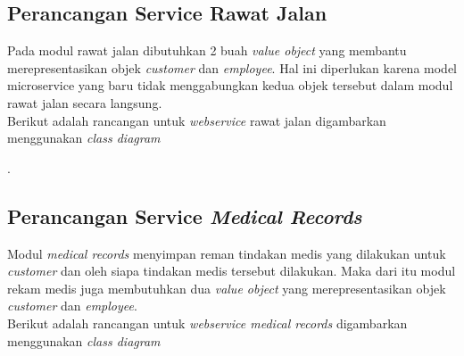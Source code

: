 \subsection{Perancangan Service Rawat Jalan}
Pada modul rawat jalan dibutuhkan 2 buah \textit{value object} yang membantu merepresentasikan objek \textit{customer} dan \textit{employee}. Hal ini diperlukan karena model microservice yang baru tidak menggabungkan kedua objek tersebut dalam modul rawat jalan secara langsung.\\
Berikut adalah rancangan untuk \textit{webservice} rawat jalan digambarkan menggunakan \textit{class diagram}

\begin{adjustbox}{width=1\textwidth}
	\begin{minipage}{\linewidth}
		.
	\end{minipage}
\end{adjustbox}

\subsection{Perancangan Service \textit{Medical Records}}
Modul \textit{medical records} menyimpan reman tindakan medis yang dilakukan untuk \textit{customer} dan oleh siapa tindakan medis tersebut dilakukan. Maka dari itu modul rekam medis juga membutuhkan dua \textit{value object} yang merepresentasikan objek \textit{customer} dan \textit{employee}.\\
Berikut adalah rancangan untuk \textit{webservice medical records} digambarkan menggunakan \textit{class diagram}

